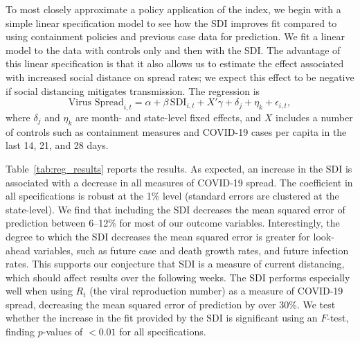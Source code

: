 \documentclass[dvipsnames]{article}
\begin{document}
To most closely approximate a policy application of the index, we begin with a simple linear specification model to see how the SDI improves fit compared to using containment policies and previous case data for prediction. We fit a linear model to the data with controls only and then with the SDI. The advantage of this linear specification is that it also allows us to estimate the effect associated with increased social distance on spread rates; we expect this effect to be negative if social distancing mitigates transmission. The regression is
\[ \text{Virus Spread}_{i,t} = \alpha + \beta \, \text{SDI}_{i,t} + X'\gamma + \delta_j + \eta_k + \epsilon_{i,t}, \]
where $\delta_j$ and $\eta_k$ are month- and state-level fixed effects, and $X$ includes a number of controls such as containment measures and COVID-19 cases per capita in the last 14, 21, and 28 days.

Table~\ref{tab:reg_results} reports the results. As expected, an increase in the SDI is associated with a decrease in all measures of COVID-19 spread. The coefficient in all specifications is robust at the 1\% level (standard errors are clustered at the state-level). We find that including the SDI decreases the mean squared error of prediction between 6--12\% for most of our outcome variables. Interestingly, the degree to which the SDI decreases the mean squared error is greater for look-ahead variables, such as future case and death growth rates, and future infection rates. This supports our conjecture that SDI is a measure of current distancing, which should affect results over the following weeks. The SDI performs especially well when using $R_t$ (the viral reproduction number) as a measure of COVID-19 spread, decreasing the mean squared error of prediction by over 30\%. We test whether the increase in the fit provided by the SDI is significant using an $F$-test, finding $p$-values of $< 0.01$ for all specifications.
\end{document}
